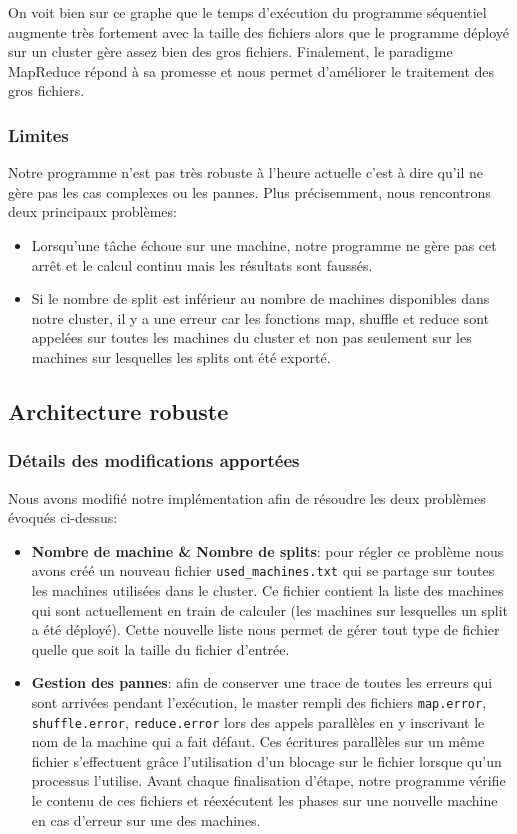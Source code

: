 \documentclass{article}
\begin{document}
On voit bien sur ce graphe que le temps d'exécution du programme séquentiel augmente très fortement avec la taille des fichiers alors que le programme déployé
sur un cluster gère assez bien des gros fichiers. Finalement, le paradigme MapReduce répond à sa promesse et nous permet d'améliorer le traitement des gros fichiers.

\subsubsection{Limites}

Notre programme n'est pas très robuste à l'heure actuelle c'est à dire qu'il ne gère pas les cas complexes ou les pannes. Plus précisemment, 
nous rencontrons deux principaux problèmes:
\begin{itemize}
    \item Lorsqu'une tâche échoue sur une machine, notre programme ne gère pas cet arrêt et le calcul continu mais les résultats sont faussés.
    \item Si le nombre de split est inférieur au nombre de machines disponibles dans notre cluster, il y a une erreur car les fonctions map, shuffle et reduce
    sont appelées sur toutes les machines du cluster et non pas seulement sur les machines sur lesquelles les splits ont été exporté.
\end{itemize}

\subsection{Architecture robuste}
\subsubsection{Détails des modifications apportées}
Nous avons modifié notre implémentation afin de résoudre les deux problèmes évoqués ci-dessus:

\begin{itemize}
    \item \textbf{Nombre de machine \& Nombre de splits}: pour régler ce problème nous avons créé un nouveau fichier \texttt{used\_machines.txt} qui se partage sur toutes les machines utilisées dans le cluster. 
    Ce fichier contient la liste des machines qui sont actuellement en train de calculer (les machines sur lesquelles un split a été déployé). Cette nouvelle liste nous permet de gérer tout type de fichier quelle que soit la taille du fichier d'entrée.
    \item \textbf{Gestion des pannes}: afin de conserver une trace de toutes les erreurs qui sont arrivées pendant l'exécution, le master rempli des fichiers \texttt{map.error}, \texttt{shuffle.error}, \texttt{reduce.error} lors des appels parallèles en y inscrivant le nom de la machine qui a fait défaut. 
    Ces écritures parallèles sur un même fichier s'effectuent grâce l'utilisation d'un blocage sur le fichier lorsque qu'un processus l'utilise. Avant chaque finalisation d'étape, notre programme vérifie le contenu de ces fichiers et réexécutent les phases
    sur une nouvelle machine en cas d'erreur sur une des machines.
\end{itemize}
\end{document}
